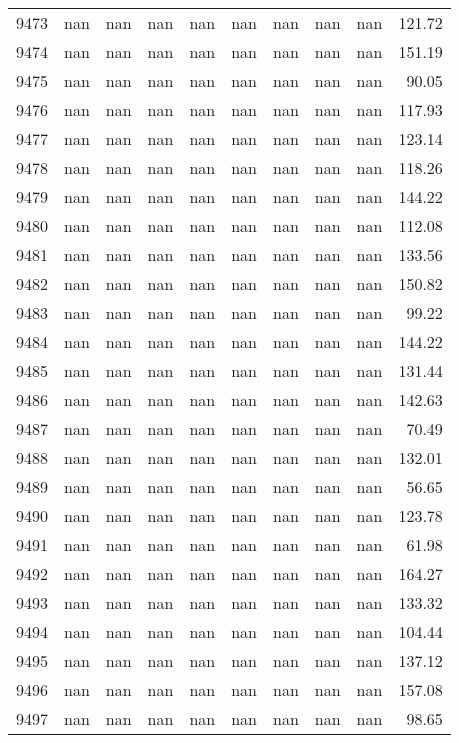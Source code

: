 \begin{tabular}{lrrrrrrrrr}
9473 & nan & nan & nan & nan & nan & nan & nan & nan & 121.72 \\
9474 & nan & nan & nan & nan & nan & nan & nan & nan & 151.19 \\
9475 & nan & nan & nan & nan & nan & nan & nan & nan & 90.05 \\
9476 & nan & nan & nan & nan & nan & nan & nan & nan & 117.93 \\
9477 & nan & nan & nan & nan & nan & nan & nan & nan & 123.14 \\
9478 & nan & nan & nan & nan & nan & nan & nan & nan & 118.26 \\
9479 & nan & nan & nan & nan & nan & nan & nan & nan & 144.22 \\
9480 & nan & nan & nan & nan & nan & nan & nan & nan & 112.08 \\
9481 & nan & nan & nan & nan & nan & nan & nan & nan & 133.56 \\
9482 & nan & nan & nan & nan & nan & nan & nan & nan & 150.82 \\
9483 & nan & nan & nan & nan & nan & nan & nan & nan & 99.22 \\
9484 & nan & nan & nan & nan & nan & nan & nan & nan & 144.22 \\
9485 & nan & nan & nan & nan & nan & nan & nan & nan & 131.44 \\
9486 & nan & nan & nan & nan & nan & nan & nan & nan & 142.63 \\
9487 & nan & nan & nan & nan & nan & nan & nan & nan & 70.49 \\
9488 & nan & nan & nan & nan & nan & nan & nan & nan & 132.01 \\
9489 & nan & nan & nan & nan & nan & nan & nan & nan & 56.65 \\
9490 & nan & nan & nan & nan & nan & nan & nan & nan & 123.78 \\
9491 & nan & nan & nan & nan & nan & nan & nan & nan & 61.98 \\
9492 & nan & nan & nan & nan & nan & nan & nan & nan & 164.27 \\
9493 & nan & nan & nan & nan & nan & nan & nan & nan & 133.32 \\
9494 & nan & nan & nan & nan & nan & nan & nan & nan & 104.44 \\
9495 & nan & nan & nan & nan & nan & nan & nan & nan & 137.12 \\
9496 & nan & nan & nan & nan & nan & nan & nan & nan & 157.08 \\
9497 & nan & nan & nan & nan & nan & nan & nan & nan & 98.65 \\

\end{tabular}
